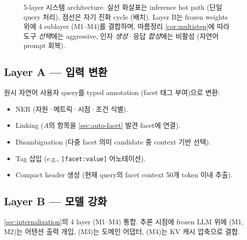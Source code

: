 \documentclass[11pt]{article}
\theoremstyle{definition}
\begin{document}
\begin{figure}[h]
\caption{5-layer 시스템 architecture. 실선 화살표는 inference hot path (단일 query 처리), 점선은 자기 진화 cycle (배치). Layer B는 frozen weights 위에 4 sublayer (M1--M4)를 결합하며, 따름정리 \ref{cor:multistep}에 따라 도구 \emph{선택}에는 aggressive, 인자 \emph{생성}·응답 \emph{합성}에는 비활성 (자연어 prompt 회복).}
\label{fig:architecture}
\end{figure}

\subsection{Layer A — 입력 변환}
\label{sec:layer-a}

원시 자연어 사용자 query를 typed annotation (facet 태그 부여)으로 변환:
\begin{itemize}[leftmargin=*]
\item NER (자원·메트릭·시점·조건 식별).
\item Linking ($A$의 항목을 \cref{sec:auto-facet} 발견 facet에 연결).
\item Disambiguation (다중 facet 의미 candidate 중 context 기반 선택).
\item Tag 삽입 (e.g., \texttt{[facet:value]} 어노테이션).
\item Compact header 생성 (현재 query의 facet context 50개 token 이내 추출).
\end{itemize}

\subsection{Layer B — 모델 강화}
\label{sec:layer-b}

\cref{sec:internalization}의 4 layer (M1--M4) 통합. 추론 시점에 frozen LLM 위에 (M1, M2)는 어텐션 출력 개입, (M3)는 도메인 어댑터, (M4)는 KV 캐시 압축으로 결합.
\end{document}
